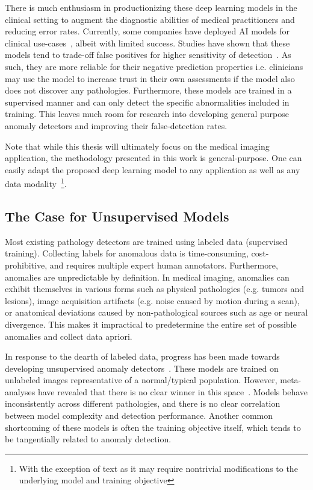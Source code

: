 There is much enthusiasm in productionizing these deep learning models in the clinical setting to augment the diagnostic abilities of medical practitioners and reducing error rates. Currently, some companies have deployed AI models for clinical use-cases~\cite{CHAMBERLIN2023e368}, albeit with limited success. Studies have shown that these models tend to trade-off false positives for higher sensitivity of detection~\cite{niehoffEvaluationClinicalPerformance2023}. As such, they are more reliable for their negative prediction properties i.e. clinicians may use the model to increase trust in their own assessments if the model also does not discover any pathologies. Furthermore, these models are trained in a supervised manner and can only detect the specific abnormalities included in training. This leaves much room for research into developing general purpose anomaly detectors  and improving their false-detection rates.

Note that while this thesis will ultimately focus on the medical imaging application, the methodology presented in this work is general-purpose. One can easily adapt the proposed deep learning model to any application as well as any data modality~\footnote{With the exception of text as it may require nontrivial modifications to the underlying model and training objective}.






\subsection*{The Case for Unsupervised Models}

Most existing pathology detectors are trained using labeled data (supervised training). Collecting labels for anomalous data is time-consuming, cost-prohibitive, and requires multiple expert human annotators.  Furthermore, anomalies are unpredictable by definition. In medical imaging, anomalies can exhibit themselves in various forms such as physical pathologies (e.g. tumors and lesions), image acquisition artifacts (e.g. noise caused by motion during a scan), or anatomical deviations caused by non-pathological sources such as age or neural divergence.
This makes it impractical to predetermine the entire set of possible anomalies and collect data apriori.

In response to the dearth of labeled data, progress has been made towards developing unsupervised anomaly detectors~\cite{bergmann2020uninformed,baur_deep_2019,ruff_unifying_2021}. These models are trained on unlabeled images representative of a normal/typical population.
However, meta-analyses have revealed that there is no clear winner in this space~\cite{baur2021,ruff_unifying_2021}. Models behave inconsistently across different pathologies, and there is no clear correlation between model complexity and detection performance. Another common shortcoming of these models is often the training objective itself, which tends to be tangentially related to anomaly detection.

